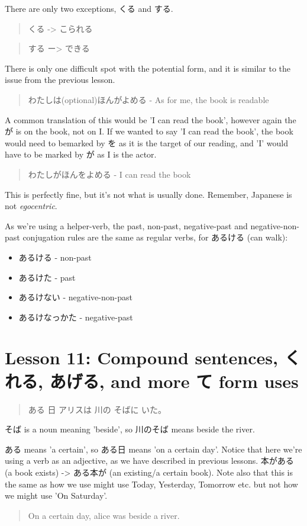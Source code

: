 \documentclass[11pt]{article}
\begin{document}
There are only two exceptions, くる and する.
\begin{quote}
くる -> こられる
\end{quote}
\begin{quote}
する ー> できる
\end{quote}

There is only one difficult spot with the potential form, and it is similar to the issue from the previous lesson.
\begin{quote}
わたしは(optional)ほんがよめる - As for me, the book is readable
\end{quote}
A common translation of this would be 'I can read the book', however again the が is on the book, not on I. If we wanted to say 'I can read the book', the book would need to bemarked by を as it is the target of our reading, and 'I' would have to be marked by が as I is the actor.
\begin{quote}
わたしがほんをよめる - I can read the book
\end{quote}
This is perfectly fine, but it's not what is usually done. Remember, Japanese is not \emph{egocentric}.

As we're using a helper-verb, the past, non-past, negative-past and negative-non-past conjugation rules are the same as regular verbs, for あるける (can walk):
\begin{itemize}
\item あるける - non-past
\item あるけた - past
\item あるけない - negative-non-past
\item あるけなっかた - negative-past
\end{itemize}
\section{Lesson 11: Compound sentences, くれる, あげる, and more て form uses}
\label{sec:orgd22a17d}
\begin{quote}
ある 日 アリスは 川の そばに いた。
\end{quote}
そば is a noun meaning 'beside', so 川のそば means beside the river.

ある means 'a certain', so ある日 means 'on a certain day'. Notice that here we're using a verb as an adjective, as we have described in previous lessons. 本がある (a book exists) -> ある本が (an existing/a certain book). Note also that this is the same as how we use might use Today, Yesterday, Tomorrow etc. but not how we might use 'On Saturday'.
\begin{quote}
On a certain day, alice was beside a river.
\end{quote}
\end{document}
